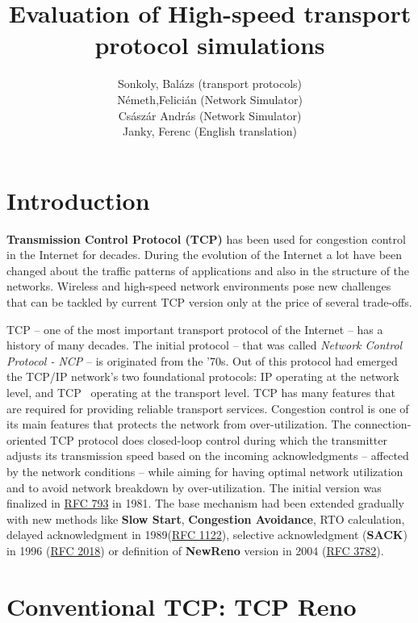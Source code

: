 \documentclass[a4paper]{article}
\title{Evaluation of High-speed transport protocol simulations}
\author{Sonkoly, Balázs (transport protocols) \\ Németh,Felicián (Network Simulator) \\Császár András (Network
Simulator) \\ Janky, Ferenc (English translation)
}
\date{}
\begin{document}
\maketitle

\tableofcontents

\section{Introduction}

\textbf{Transmission Control Protocol (TCP)} has been used for congestion control in the Internet for decades. During
the evolution of the Internet a lot have been changed about the traffic patterns of applications and also in the
structure of the networks. Wireless and high-speed network environments pose new challenges that can be tackled by
current TCP version only at the price of several trade-offs.

TCP -- one of the most important transport protocol of the Internet -- has a history of many decades. The initial
protocol -- that was called \emph{Network Control Protocol - NCP} -- is originated from the '70s. Out of this protocol
had emerged the TCP/IP network's two foundational protocols: IP operating at the network level, and
TCP~\cite{CongestionAvoidance} operating at the transport level. TCP has many features that are required for providing
reliable transport services. Congestion control is one of its main features that protects the network from
over-utilization. The connection-oriented TCP protocol does closed-loop control during which the transmitter adjusts
its transmission speed based on the incoming acknowledgments -- affected by the network conditions -- while aiming for having
optimal network utilization and to avoid network breakdown by over-utilization. The initial version was finalized in
\href{http://www.faqs.org/rfcs/rfc793.html}{RFC 793} in 1981. The base mechanism had been extended gradually with new
methods like \textbf{Slow Start}, \textbf{Congestion Avoidance}, RTO calculation, delayed acknowledgment in
1989(\href{http://www.faqs.org/rfcs/rfc1122.html}{RFC 1122}), selective acknowledgment (\textbf{SACK}) in 1996
(\href{http://www.faqs.org/rfcs/rfc2018.html}{RFC 2018}) or definition of \textbf{NewReno} version in 2004
(\href{http://www.faqs.org/rfcs/rfc3782.html}{RFC 3782}).

\section{Conventional TCP: TCP Reno}
\end{document}

